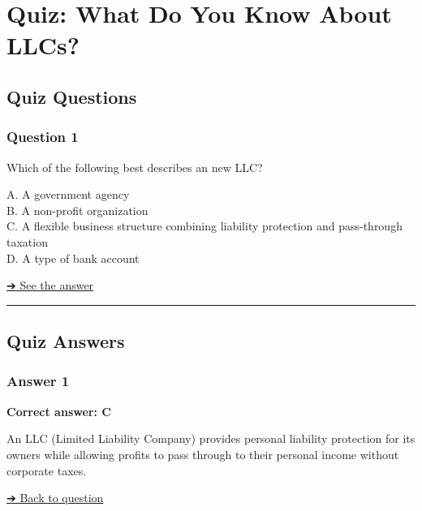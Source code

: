 
\section{Quiz: What Do You Know About
LLCs?}\label{quiz-what-do-you-know-about-llcs}

\subsection{Quiz Questions}\label{quiz-questions}

\subsubsection{Question 1}\label{question-1}

Which of the following best describes an new LLC?

A. A government agency\\
B. A non-profit organization\\
C. A flexible business structure combining liability protection and
pass-through taxation\\
D. A type of bank account

\hyperref[answer-1]{➔ See the answer}

\begin{center}\rule{0.5\linewidth}{0.5pt}\end{center}

\subsection{Quiz Answers}\label{quiz-answers}

\subsubsection{Answer 1}\label{answer-1}

\textbf{Correct answer: C}

An LLC (Limited Liability Company) provides personal liability
protection for its owners while allowing profits to pass through to
their personal income without corporate taxes.

\hyperref[question-1]{➔ Back to question}
